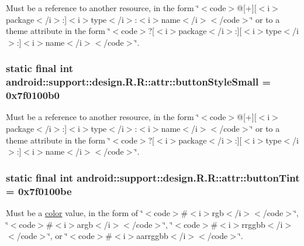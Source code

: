 Must be a reference to another resource, in the form \char`\"{}$<$code$>$@\mbox{[}+\mbox{]}\mbox{[}$<$i$>$package$<$/i$>$:\mbox{]}$<$i$>$type$<$/i$>$:$<$i$>$name$<$/i$>$$<$/code$>$\char`\"{} or to a theme attribute in the form \char`\"{}$<$code$>$?\mbox{[}$<$i$>$package$<$/i$>$:\mbox{]}\mbox{[}$<$i$>$type$<$/i$>$:\mbox{]}$<$i$>$name$<$/i$>$$<$/code$>$\char`\"{}. \hypertarget{classandroid_1_1support_1_1design_1_1_r_1_1attr_a64e7caa48e465560599e39bac59e0c5}{
\subsubsection[{buttonStyleSmall}]{\setlength{\rightskip}{0pt plus 5cm}static final int android::support::design.R.R::attr::buttonStyleSmall = 0x7f0100b0}}
\label{classandroid_1_1support_1_1design_1_1_r_1_1attr_a64e7caa48e465560599e39bac59e0c5}


Must be a reference to another resource, in the form \char`\"{}$<$code$>$@\mbox{[}+\mbox{]}\mbox{[}$<$i$>$package$<$/i$>$:\mbox{]}$<$i$>$type$<$/i$>$:$<$i$>$name$<$/i$>$$<$/code$>$\char`\"{} or to a theme attribute in the form \char`\"{}$<$code$>$?\mbox{[}$<$i$>$package$<$/i$>$:\mbox{]}\mbox{[}$<$i$>$type$<$/i$>$:\mbox{]}$<$i$>$name$<$/i$>$$<$/code$>$\char`\"{}. \hypertarget{classandroid_1_1support_1_1design_1_1_r_1_1attr_d351fd668982d9d3cd0c3c2a9572122c}{
\subsubsection[{buttonTint}]{\setlength{\rightskip}{0pt plus 5cm}static final int android::support::design.R.R::attr::buttonTint = 0x7f0100be}}
\label{classandroid_1_1support_1_1design_1_1_r_1_1attr_d351fd668982d9d3cd0c3c2a9572122c}


Must be a \hyperlink{classandroid_1_1support_1_1design_1_1_r_1_1color}{color} value, in the form of \char`\"{}$<$code$>$\#$<$i$>$rgb$<$/i$>$$<$/code$>$\char`\"{}, \char`\"{}$<$code$>$\#$<$i$>$argb$<$/i$>$$<$/code$>$\char`\"{}, \char`\"{}$<$code$>$\#$<$i$>$rrggbb$<$/i$>$$<$/code$>$\char`\"{}, or \char`\"{}$<$code$>$\#$<$i$>$aarrggbb$<$/i$>$$<$/code$>$\char`\"{}. 

